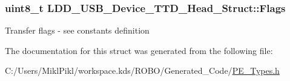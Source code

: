 \subsubsection[{Flags}]{\setlength{\rightskip}{0pt plus 5cm}uint8\+\_\+t L\+D\+D\+\_\+\+U\+S\+B\+\_\+\+Device\+\_\+\+T\+T\+D\+\_\+\+Head\+\_\+\+Struct\+::\+Flags}\label{struct_l_d_d___u_s_b___device___t_t_d___head___struct_a9572bb866ff1f22ed881f3ff618c0445}
Transfer flags -\/ see constants definition 

The documentation for this struct was generated from the following file\+:\begin{DoxyCompactItemize}
\item 
C\+:/\+Users/\+Mikl\+Pikl/workspace.\+kds/\+R\+O\+B\+O/\+Generated\+\_\+\+Code/\hyperlink{_p_e___types_8h}{P\+E\+\_\+\+Types.\+h}\end{DoxyCompactItemize}
